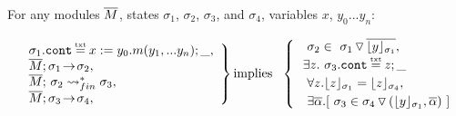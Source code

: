  
 \begin{lemma}
 \label{lemma:call:return}
 For any modules $\overline{M}$, states $\sigma_1$, $\sigma_2$, $\sigma_3$, and $\sigma_4$, variables $x$, $y_0... y_n$:
 
 $  
   \left. %
   \begin{array}{l}  \ \strut \ \ \sigma_1.\prg{cont}\txteq x:= y_0.m(y_1,...y_n);\_ ,\\
    \ \strut \ \  \leadstoOrig {\Mtwo} {\sigma_1}   {\sigma_2} , \\
     \ \strut \ \  \leadstoBoundedStarFin  {\Mtwo}  {\sigma_2}  {\sigma_3}, \\
  \ \strut \ \  \leadstoOrig {\Mtwo} {\sigma_3}   {\sigma_4}, 
    \end{array} 
\right \}
 \mbox{implies} \ \ 
  \begin{cases}
     \ \strut \ \  \sigma_2 \in \PushS  {\interpret {\sigma_1} {y}} {\sigma_1},\\
     \ \strut \  \exists z.\ \sigma_3.\prg{cont}\txteq z;\_  \\
       \ \strut \ \       \forall z. \interpret {\sigma_1} {z} = \interpret {\sigma_4} {z},\\  
        \ \strut \ \       \exists \overline \alpha. [\ \sigma_3 \in  \PushSLong  {( {\interpret {\sigma_1} {y}},{\overline \alpha})} {\sigma_4} \ ]
    \end{cases} 
$
 \end{lemma}

